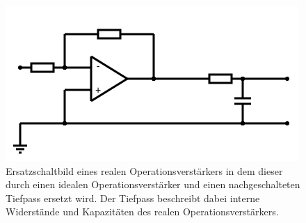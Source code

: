 \FloatBarrier
\begin{figure}[!h]
\centering
\includegraphics[scale=0.75]{../Grafiken/Ersatzschaltbild.jpg}
\caption{Ersatzschaltbild eines realen Operationsverstärkers 
	in dem dieser durch einen idealen Operationsverstärker und einen 
	nachgeschalteten Tiefpass ersetzt wird. Der Tiefpass beschreibt dabei 
	interne Widerstände und Kapazitäten des realen Operationsverstärkers.
	\label{fig:ersatzschaltbild}}
\end{figure}
\FloatBarrier